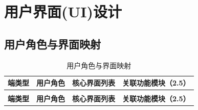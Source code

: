 \section{用户界面(UI)设计}

\subsection{用户角色与界面映射}

\begin{longtable}{>{\centering\arraybackslash}m{1.5cm} >{\centering\arraybackslash}m{1cm} >{\centering\arraybackslash}m{9cm} >{\centering\arraybackslash}m{2cm}}

    \caption{用户角色与界面映射} \label{tab:training}                                                                                                                                                                                                                                                                                                                                                                         \\

    \toprule
    \textbf{端类型} & \textbf{用户角色} & \textbf{核心界面列表}                                                                                                                                                                                                                                                                                                                                            & \textbf{关联功能模块（2.5）} \\
    \midrule
    \endfirsthead

    \multicolumn{4}{c}{{\tablename\ \thetable{} 续表}}                                                                                                                                                                                                                                                                                                                                                                 \\
    \toprule
    \textbf{端类型} & \textbf{用户角色} & \textbf{核心界面列表}                                                                                                                                                                                                                                                                                                                                            & \textbf{关联功能模块（2.5）} \\
    \midrule
    \endhead


\end{longtable}
